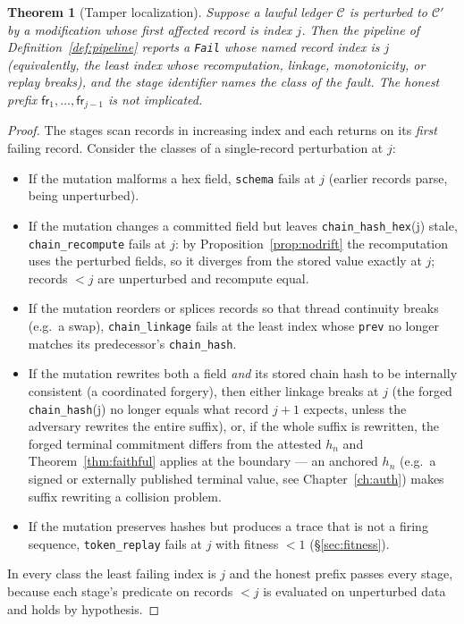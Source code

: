 \documentclass[11pt,oneside]{book}
\theoremstyle{definition}
\theoremstyle{plain}
\newtheorem{theorem}{Theorem}[chapter]
\theoremstyle{remark}
\newcommand{\fr}{\mathsf{fr}}                   %
\newcommand{\code}[1]{\texttt{#1}}
\newcommand{\Ledger}{\mathcal{C}}               %
\begin{document}
\begin{theorem}[Tamper localization]\label{thm:localize}
Suppose a lawful ledger $\Ledger$ is perturbed to $\Ledger'$ by a modification whose
first affected record is index $j$. Then the pipeline of Definition~\ref{def:pipeline} reports
a \code{Fail} whose named record index is $j$ (equivalently, the least index whose
recomputation, linkage, monotonicity, or replay breaks), and the stage identifier names the
class of the fault. The honest prefix $\fr_1,\dots,\fr_{j-1}$ is not implicated.
\end{theorem}

\begin{proof}
The stages scan records in increasing index and each returns on its \emph{first} failing
record. Consider the classes of a single-record perturbation at $j$:
\begin{itemize}[leftmargin=*]
\item If the mutation malforms a hex field, \code{schema} fails at $j$ (earlier records parse,
being unperturbed).
\item If the mutation changes a committed field but leaves \code{chain\_hash\_hex}(j) stale,
\code{chain\_recompute} fails at $j$: by Proposition~\ref{prop:nodrift} the recomputation uses
the perturbed fields, so it diverges from the stored value exactly at $j$; records $<j$ are
unperturbed and recompute equal.
\item If the mutation reorders or splices records so that thread continuity breaks (e.g.\ a
swap), \code{chain\_linkage} fails at the least index whose \code{prev} no longer matches its
predecessor's \code{chain\_hash}.
\item If the mutation rewrites both a field \emph{and} its stored chain hash to be internally
consistent (a coordinated forgery), then either linkage breaks at $j$ (the forged
\code{chain\_hash}(j) no longer equals what record $j{+}1$ expects, unless the adversary
rewrites the entire suffix), or, if the whole suffix is rewritten, the forged terminal
commitment differs from the attested $h_n$ and Theorem~\ref{thm:faithful} applies at the
boundary --- an anchored $h_n$ (e.g.\ a signed or externally published terminal value, see
Chapter~\ref{ch:auth}) makes suffix rewriting a collision problem.
\item If the mutation preserves hashes but produces a trace that is not a firing sequence,
\code{token\_replay} fails at $j$ with fitness $<1$ (\S\ref{sec:fitness}).
\end{itemize}
In every class the least failing index is $j$ and the honest prefix passes every stage,
because each stage's predicate on records $<j$ is evaluated on unperturbed data and holds by
hypothesis. \end{proof}
\end{document}
